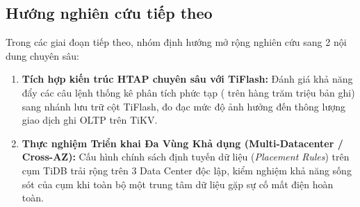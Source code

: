 \subsection{Hướng nghiên cứu tiếp theo}

Trong các giai đoạn tiếp theo, nhóm định hướng mở rộng nghiên cứu sang 2 nội dung chuyên sâu:
\begin{enumerate}
  \item \textbf{Tích hợp kiến trúc HTAP chuyên sâu với TiFlash:} Đánh giá khả năng đẩy các câu lệnh thống kê phân tích phức tạp ( trên hàng trăm triệu bản ghi) sang nhánh lưu trữ cột TiFlash, đo đạc mức độ ảnh hưởng đến thông lượng giao dịch ghi OLTP trên TiKV.
  \item \textbf{Thực nghiệm Triển khai Đa Vùng Khả dụng (Multi-Datacenter / Cross-AZ):} Cấu hình chính sách định tuyến dữ liệu (\textit{Placement Rules}) trên cụm TiDB trải rộng trên 3 Data Center độc lập, kiểm nghiệm khả năng sống sót của cụm khi toàn bộ một trung tâm dữ liệu gặp sự cố mất điện hoàn toàn.
\end{enumerate}
